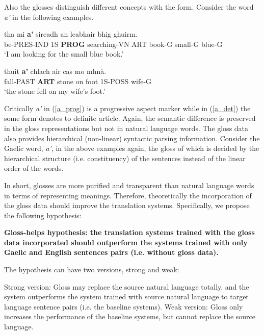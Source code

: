 \documentclass[11pt,a4paper]{article}
\begin{document}
Also the glosses distinguish different concepts with the form. Consider the word \textit{a'} in the following examples.  

\begin{exe}  
\ex \label{a_prog}
\gll tha mi \textbf{a'} sireadh an leabhair bhig ghuirm.\\
be-PRES-IND 1S \textbf{PROG} searching-VN ART book-G small-G blue-G\\
\glt `I am looking for the small blue book.' \citep[p. 29]{lamb2001scottish}

\ex \label{a_det}
\gll thuit \textbf{a'} chlach air cas mo mhn\`a.\\
fall-PAST \textbf{ART} stone on foot 1S-POSS wife-G\\
\glt`the stone fell on my wife's foot.' \citep[p. 30]{lamb2001scottish} 	
\end{exe}

Critically \textit{a'} in (\ref{a_prog}) is a progressive aspect marker while in (\ref{a_det}) the some form denotes to definite article. Again, the semantic difference is preserved in the gloss representations but not in natural language words.  
The gloss data also provides hierarchical (non-linear) syntactic parsing information. Consider the Gaelic word, \textit{a'}, in the above examples again, the gloss of which is decided by the hierarchical structure (i.e. constituency) of the sentences instead of the linear order of the words.    

In short, glosses are more purified and transparent than natural language words in terms of representing meanings. Therefore, theoretically the incorporation of the gloss data should improve the translation systems. Specifically, we propose the following hypothesis:

\begin{exe} 
\ex \textbf{Gloss-helps hypothesis: the translation systems trained with the gloss data incorporated should outperform the systems trained with only Gaelic and English sentences pairs (i.e. without gloss data).}\label{hypothesis}

The hypothesis can have two versions, strong and weak:
	\begin{xlist}
	\ex \label{strong_hy} Strong version: Gloss may replace the source natural language totally, and the system outperforms the system trained with source natural language to target language sentence pairs (i.e. the baseline systems).  
	\ex \label{weak_hy} Weak version: Gloss only increases the performance of the baseline systems, but cannot replace the source language.
	\end{xlist}
\end{exe}
\end{document}
